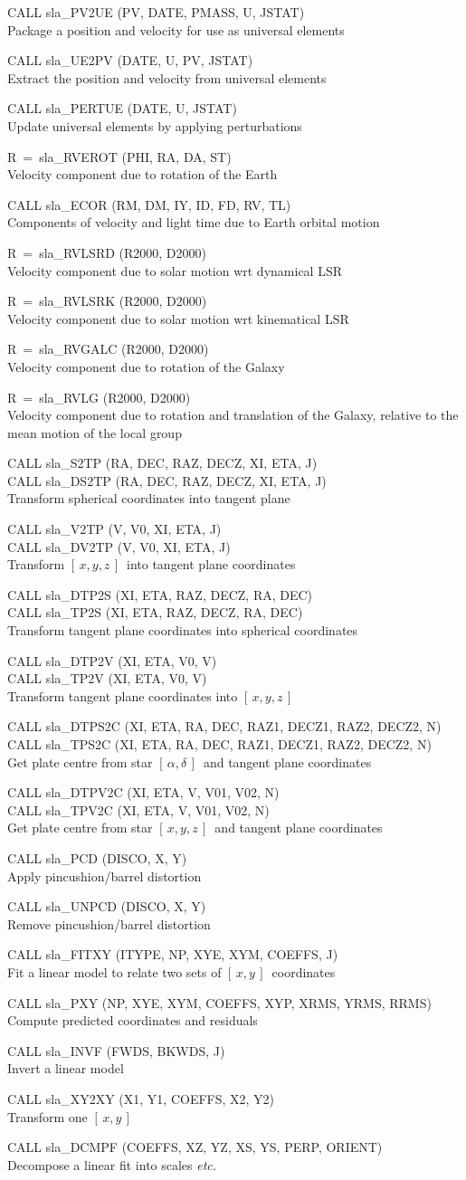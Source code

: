 \documentclass[11pt,twoside]{article}
\newcommand{\radec}     {$[\,\alpha,\delta\,]$}
\newcommand{\xy}        {$[\,x,y\,]$}
\newcommand{\xyz}       {$[\,x,y,z\,]$}
\newcommand{\callhead}[1]{\goodbreak\vspace{\bigskipamount}{\large\bf{#1}}}
\newenvironment{callset}{\begin{list}{}{\setlength{\leftmargin}{2cm}
                             \setlength{\parsep}{\smallskipamount}}}{\end{list}}
\newcommand{\subp}[1]{\item\hspace{-1cm}#1\\}
\newcommand{\subq}[2]{\item\hspace{-1cm}#1\\\hspace*{-1cm}#2\\}
\begin{document}
\begin{callset}
\subp{CALL sla\_PV2UE (PV, DATE, PMASS, U, JSTAT)}
   Package a position and velocity for use as universal elements
\subp{CALL sla\_UE2PV (DATE, U, PV, JSTAT)}
   Extract the position and velocity from universal elements
\subp{CALL sla\_PERTUE (DATE, U, JSTAT)}
   Update universal elements by applying perturbations
\subp{R~=~sla\_RVEROT (PHI, RA, DA, ST)}
   Velocity component due to rotation of the Earth
\subp{CALL sla\_ECOR (RM, DM, IY, ID, FD, RV, TL)}
   Components of velocity and light time due to Earth orbital motion
\subp{R~=~sla\_RVLSRD (R2000, D2000)}
   Velocity component due to solar motion wrt dynamical LSR
\subp{R~=~sla\_RVLSRK (R2000, D2000)}
   Velocity component due to solar motion wrt kinematical LSR
\subp{R~=~sla\_RVGALC (R2000, D2000)}
   Velocity component due to rotation of the Galaxy
\subp{R~=~sla\_RVLG (R2000, D2000)}
   Velocity component due to rotation and translation of the
   Galaxy, relative to the mean motion of the local group
\end{callset}

\callhead{Astrometry}
\begin{callset}
\subq{CALL sla\_S2TP (RA, DEC, RAZ, DECZ, XI, ETA, J)}
     {CALL sla\_DS2TP (RA, DEC, RAZ, DECZ, XI, ETA, J)}
   Transform spherical coordinates into tangent plane
\subq{CALL sla\_V2TP (V, V0, XI, ETA, J)}
     {CALL sla\_DV2TP (V, V0, XI, ETA, J)}
   Transform \xyz\ into tangent plane coordinates
\subq{CALL sla\_DTP2S (XI, ETA, RAZ, DECZ, RA, DEC)}
     {CALL sla\_TP2S (XI, ETA, RAZ, DECZ, RA, DEC)}
   Transform tangent plane coordinates into spherical coordinates
\subq{CALL sla\_DTP2V (XI, ETA, V0, V)}
     {CALL sla\_TP2V (XI, ETA, V0, V)}
   Transform tangent plane coordinates into \xyz
\subq{CALL sla\_DTPS2C (XI, ETA, RA, DEC, RAZ1, DECZ1, RAZ2, DECZ2, N)}
     {CALL sla\_TPS2C (XI, ETA, RA, DEC, RAZ1, DECZ1, RAZ2, DECZ2, N)}
   Get plate centre from star \radec\ and tangent plane coordinates
\subq{CALL sla\_DTPV2C (XI, ETA, V, V01, V02, N)}
     {CALL sla\_TPV2C (XI, ETA, V, V01, V02, N)}
   Get plate centre from star \xyz\ and tangent plane coordinates
\subp{CALL sla\_PCD (DISCO, X, Y)}
   Apply pincushion/barrel distortion
\subp{CALL sla\_UNPCD (DISCO, X, Y)}
   Remove pincushion/barrel distortion
\subp{CALL sla\_FITXY (ITYPE, NP, XYE, XYM, COEFFS, J)}
   Fit a linear model to relate two sets of \xy\ coordinates
\subp{CALL sla\_PXY (NP, XYE, XYM, COEFFS, XYP, XRMS, YRMS, RRMS)}
   Compute predicted coordinates and residuals
\subp{CALL sla\_INVF (FWDS, BKWDS, J)}
   Invert a linear model
\subp{CALL sla\_XY2XY (X1, Y1, COEFFS, X2, Y2)}
   Transform one \xy
\subp{CALL sla\_DCMPF (COEFFS, XZ, YZ, XS, YS, PERP, ORIENT)}
   Decompose a linear fit into scales {\it etc.}
\end{callset}
\end{document}
